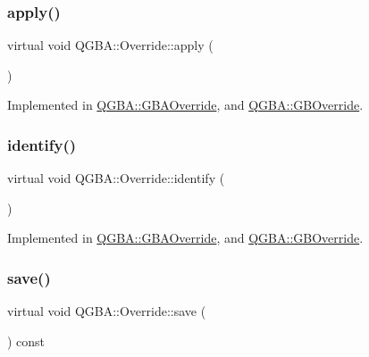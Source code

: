 \subsubsection{\texorpdfstring{apply()}{apply()}}
{\footnotesize\ttfamily virtual void Q\+G\+B\+A\+::\+Override\+::apply (\begin{DoxyParamCaption}\item[{struct m\+Core $\ast$}]{ }\end{DoxyParamCaption})\hspace{0.3cm}{\ttfamily [pure virtual]}}



Implemented in \mbox{\hyperlink{class_q_g_b_a_1_1_g_b_a_override_a3d8805aff62b8b92349610054bc85bf3}{Q\+G\+B\+A\+::\+G\+B\+A\+Override}}, and \mbox{\hyperlink{class_q_g_b_a_1_1_g_b_override_a0b0437da44fc94de35887d80440bf089}{Q\+G\+B\+A\+::\+G\+B\+Override}}.

\mbox{\label{class_q_g_b_a_1_1_override_aac1ad966769d5424736654fdc69a3725}} 
\subsubsection{\texorpdfstring{identify()}{identify()}}
{\footnotesize\ttfamily virtual void Q\+G\+B\+A\+::\+Override\+::identify (\begin{DoxyParamCaption}\item[{const struct m\+Core $\ast$}]{ }\end{DoxyParamCaption})\hspace{0.3cm}{\ttfamily [pure virtual]}}



Implemented in \mbox{\hyperlink{class_q_g_b_a_1_1_g_b_a_override_a14151061a9f7a9b9c6233c93f554b35b}{Q\+G\+B\+A\+::\+G\+B\+A\+Override}}, and \mbox{\hyperlink{class_q_g_b_a_1_1_g_b_override_a287ae6b1d0a643f36652f72e22a1483e}{Q\+G\+B\+A\+::\+G\+B\+Override}}.

\mbox{\label{class_q_g_b_a_1_1_override_aa03c9614ec596b7e2fb15e59483fb99e}} 
\subsubsection{\texorpdfstring{save()}{save()}}
{\footnotesize\ttfamily virtual void Q\+G\+B\+A\+::\+Override\+::save (\begin{DoxyParamCaption}\item[{struct Configuration $\ast$}]{ }\end{DoxyParamCaption}) const\hspace{0.3cm}{\ttfamily [pure virtual]}}



